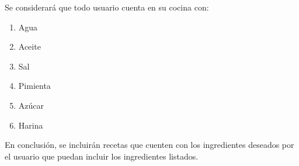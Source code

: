 Se considerará que todo usuario cuenta en su cocina con: 
\begin{enumerate}
    \item Agua
    \item Aceite
    \item Sal
    \item Pimienta
    \item Azúcar
    \item Harina
\end{enumerate}

En conclusión, se incluirán recetas que cuenten con los ingredientes deseados por el usuario que puedan incluir los ingredientes listados.